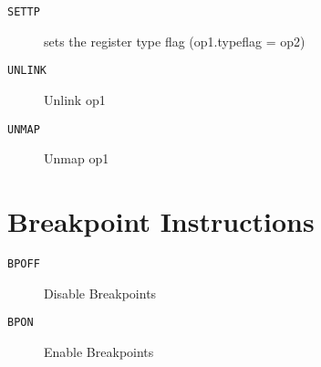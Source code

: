 \begin{description}
\item[\texttt{SETTP}]  sets the register type flag (op1.typeflag = op2)\\

\end{description}
\begin{description}
\item[\texttt{UNLINK}]  Unlink op1\\

\end{description}
\begin{description}
\item[\texttt{UNMAP}]  Unmap op1\\

\end{description}
\section{Breakpoint Instructions}
\begin{description}
\item[\texttt{BPOFF}]  Disable Breakpoints\\

\end{description}
\begin{description}
\item[\texttt{BPON}]  Enable Breakpoints\\

\end{description}
